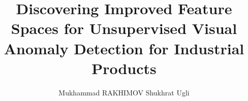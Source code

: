 \title{Discovering Improved Feature Spaces for Unsupervised Visual Anomaly Detection for Industrial Products}
\japtitle{}
\author{Mukhammad RAKHIMOV Shukhrat Ugli}
\maketitle